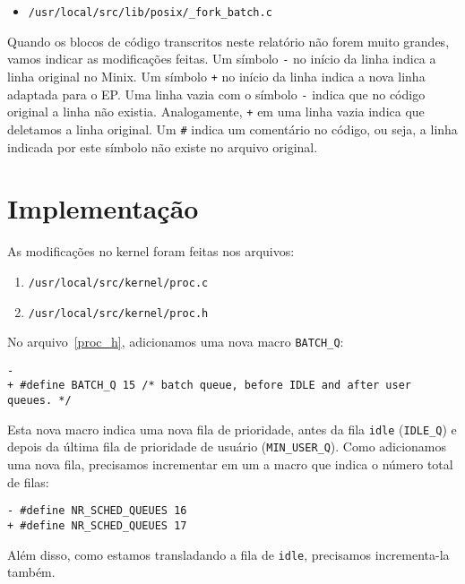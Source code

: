 \documentclass{amsart}
\theoremstyle{plain}
\newcommand{\code}[1]{\lstinline[mathescape=true]{#1}}
\begin{document}
\begin{itemize}
  \item \code{/usr/local/src/lib/posix/_fork_batch.c}
\end{itemize}

Quando os blocos de código transcritos neste relatório não forem muito grandes, vamos indicar as
modificações feitas. Um símbolo \code{-} no início da linha indica a linha original no Minix. Um
símbolo \code{+} no início da linha indica a nova linha adaptada para o EP\@. Uma linha vazia com o
símbolo \code{-} indica que no código original a linha não existia. Analogamente, \code{+} em uma
linha vazia indica que deletamos a linha original. Um \code{#} indica um comentário no código, ou
seja, a linha indicada por este símbolo não existe no arquivo original.

\section{Implementação}

As modificações no kernel foram feitas nos arquivos:

\begin{enumerate}
  \item\label{proc_c} \code{/usr/local/src/kernel/proc.c}
  \item\label{proc_h} \code{/usr/local/src/kernel/proc.h}
\end{enumerate}

No arquivo~\ref{proc_h}, adicionamos uma nova macro \code{BATCH_Q}:

\begin{lstlisting}[frame=leftline,mathescape=true,style=nonumbers]
-
+ #define BATCH_Q 15 /* batch queue, before IDLE and after user queues. */
\end{lstlisting}

Esta nova macro indica uma nova fila de prioridade, antes da fila \code{idle} (\code{IDLE_Q}) e
depois da última fila de prioridade de usuário (\code{MIN_USER_Q}). Como adicionamos uma nova fila,
precisamos incrementar em um a macro que indica o número total de filas:

\begin{lstlisting}[frame=leftline,mathescape=true,style=nonumbers]
- #define NR_SCHED_QUEUES 16
+ #define NR_SCHED_QUEUES 17
\end{lstlisting}

Além disso, como estamos transladando a fila de \code{idle}, precisamos incrementa-la também.
\end{document}
